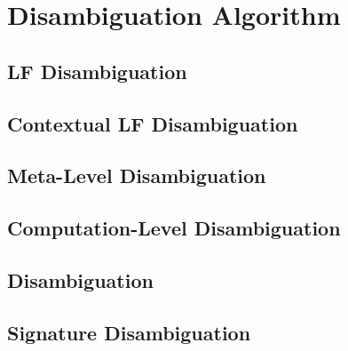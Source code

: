 \chapter{Disambiguation Algorithm}


\section{\acs{LF} Disambiguation}







\section{Contextual \acs{LF} Disambiguation}







\section{Meta-Level Disambiguation}







\section{Computation-Level Disambiguation}









\section{\Harpoon Disambiguation}

\section{\Beluga Signature Disambiguation}


